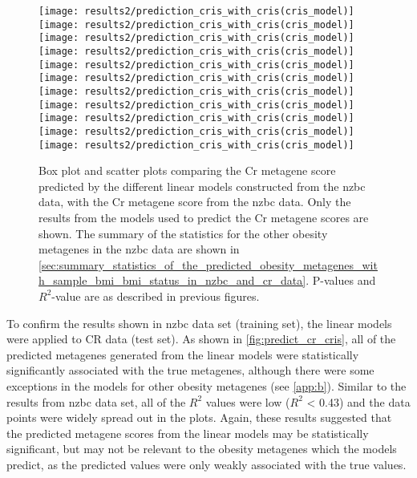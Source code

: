 \begin{figure}[htpb]
	\centering
	\texttt{[image: results2/prediction\_cris\_with\_cris(cris\_model)]}
	\texttt{[image: results2/prediction\_cris\_with\_cris(cris\_model)]}
	\texttt{[image: results2/prediction\_cris\_with\_cris(cris\_model)]}
	\texttt{[image: results2/prediction\_cris\_with\_cris(cris\_model)]}
	\texttt{[image: results2/prediction\_cris\_with\_cris(cris\_model)]}
	\texttt{[image: results2/prediction\_cris\_with\_cris(cris\_model)]}
	\texttt{[image: results2/prediction\_cris\_with\_cris(cris\_model)]}
	\texttt{[image: results2/prediction\_cris\_with\_cris(cris\_model)]}
	\texttt{[image: results2/prediction\_cris\_with\_cris(cris\_model)]}
	\texttt{[image: results2/prediction\_cris\_with\_cris(cris\_model)]}
	\texttt{[image: results2/prediction\_cris\_with\_cris(cris\_model)]}
	\caption[Comparison of the predicted Cr metagene scores with the Cr metagene score from the \gls{nzbc} data]{ Box plot and scatter plots comparing the Cr metagene score predicted by the different linear models constructed from the \gls{nzbc} data, with the Cr metagene score from the \gls{nzbc} data.
	Only the results from the models used to predict the Cr metagene scores are shown.
	The summary of the statistics for the other obesity metagenes in the \gls{nzbc} data are shown in \cref{sec:summary_statistics_of_the_predicted_obesity_metagenes_with_sample_bmi_bmi_status_in_nzbc_and_cr_data}.
	P-values and $R^2$-value are as described in previous figures.
	}
	\label{fig:predict_cris_cris}
\end{figure}

To confirm the results shown in \gls{nzbc} data set (training set), the linear models were applied to CR data (test set).
As shown in \cref{fig:predict_cr_cris}, all of the predicted metagenes generated from the linear models were statistically significantly associated with the true metagenes, although there were some exceptions in the models for other obesity metagenes (see \cref{app:b}).
Similar to the results from \gls{nzbc} data set, all of the $R^2$ values were low ($R^2$ \textless{} 0.43) and the data points were widely spread out in the plots.
Again, these results suggested that the predicted metagene scores from the linear models may be statistically significant, but may not be relevant to the obesity metagenes which the models predict, as the predicted values were only weakly associated with the true values.
\\

